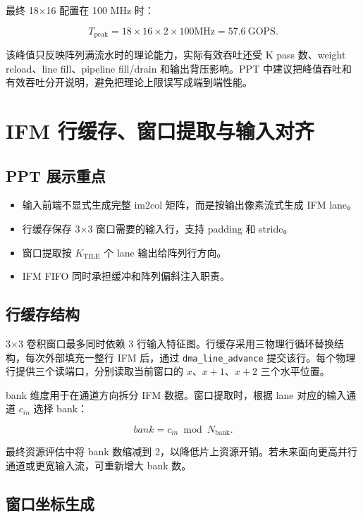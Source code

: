 \documentclass[fontset=fandol,ugly,language=chinese]{pkuthss}
\newcommand{\signal}[1]{\texttt{#1}}
\newcommand{\KTILE}{K_{\mathrm{TILE}}}
\begin{document}
最终 18$\times$16 配置在 100 MHz 时：

\begin{equation}
T_{\mathrm{peak}} = 18 \times 16 \times 2 \times 100\mathrm{MHz}
=57.6\ \mathrm{GOPS}.
\end{equation}

该峰值只反映阵列满流水时的理论能力，实际有效吞吐还受 K pass 数、weight reload、line fill、pipeline fill/drain 和输出背压影响。PPT 中建议把峰值吞吐和有效吞吐分开说明，避免把理论上限误写成端到端性能。

\chapter{IFM 行缓存、窗口提取与输入对齐}

\section{PPT 展示重点}

\begin{itemize}
    \item 输入前端不显式生成完整 im2col 矩阵，而是按输出像素流式生成 IFM lane。
    \item 行缓存保存 3$\times$3 窗口需要的输入行，支持 padding 和 stride。
    \item 窗口提取按 $\KTILE$ 个 lane 输出给阵列行方向。
    \item IFM FIFO 同时承担缓冲和阵列偏斜注入职责。
\end{itemize}

\section{行缓存结构}

3$\times$3 卷积窗口最多同时依赖 3 行输入特征图。行缓存采用三物理行循环替换结构，每次外部填充一整行 IFM 后，通过 \signal{dma\_line\_advance} 提交该行。每个物理行提供三个读端口，分别读取当前窗口的 $x$、$x+1$、$x+2$ 三个水平位置。

bank 维度用于在通道方向拆分 IFM 数据。窗口提取时，根据 lane 对应的输入通道 $c_{in}$ 选择 bank：

\begin{equation}
bank = c_{in} \bmod N_{\mathrm{bank}}.
\end{equation}

最终资源评估中将 bank 数缩减到 2，以降低片上资源开销。若未来面向更高并行通道或更宽输入流，可重新增大 bank 数。

\section{窗口坐标生成}
\end{document}
